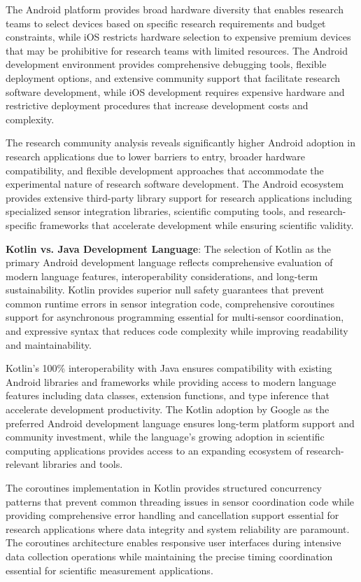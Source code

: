 \documentclass[11pt,a4paper]{article}
\begin{document}
The Android platform provides broad hardware diversity that enables research teams to select devices based on specific
research requirements and budget constraints, while iOS restricts hardware selection to expensive premium devices that
may be prohibitive for research teams with limited resources. The Android development environment provides comprehensive
debugging tools, flexible deployment options, and extensive community support that facilitate research software
development, while iOS development requires expensive hardware and restrictive deployment procedures that increase
development costs and complexity.

The research community analysis reveals significantly higher Android adoption in research applications due to lower
barriers to entry, broader hardware compatibility, and flexible development approaches that accommodate the experimental
nature of research software development. The Android ecosystem provides extensive third-party library support for
research applications including specialized sensor integration libraries, scientific computing tools, and
research-specific frameworks that accelerate development while ensuring scientific validity.

\textbf{Kotlin vs. Java Development Language}: The selection of Kotlin as the primary Android development language reflects
comprehensive evaluation of modern language features, interoperability considerations, and long-term sustainability.
Kotlin provides superior null safety guarantees that prevent common runtime errors in sensor integration code,
comprehensive coroutines support for asynchronous programming essential for multi-sensor coordination, and expressive
syntax that reduces code complexity while improving readability and maintainability.

Kotlin's 100\% interoperability with Java ensures compatibility with existing Android libraries and frameworks while
providing access to modern language features including data classes, extension functions, and type inference that
accelerate development productivity. The Kotlin adoption by Google as the preferred Android development language ensures
long-term platform support and community investment, while the language's growing adoption in scientific computing
applications provides access to an expanding ecosystem of research-relevant libraries and tools.

The coroutines implementation in Kotlin provides structured concurrency patterns that prevent common threading issues in
sensor coordination code while providing comprehensive error handling and cancellation support essential for research
applications where data integrity and system reliability are paramount. The coroutines architecture enables responsive
user interfaces during intensive data collection operations while maintaining the precise timing coordination essential
for scientific measurement applications.
\end{document}
